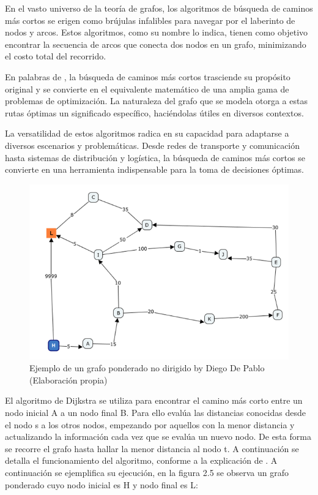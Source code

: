 En el vasto universo de la teoría de grafos, los algoritmos de búsqueda de caminos más cortos se erigen como brújulas infalibles para navegar por el laberinto de nodos y arcos. Estos algoritmos, como su nombre lo indica, tienen como objetivo encontrar la secuencia de arcos que conecta dos nodos en un grafo, minimizando el costo total del recorrido.

En palabras de \cite{deo}, la búsqueda de caminos más cortos trasciende su propósito original y se convierte en el equivalente matemático de una amplia gama de problemas de optimización. La naturaleza del grafo que se modela otorga a estas rutas óptimas un significado específico, haciéndolas útiles en diversos contextos.

La versatilidad de estos algoritmos radica en su capacidad para adaptarse a diversos escenarios y problemáticas. Desde redes de transporte y comunicación hasta sistemas de distribución y logística, la búsqueda de caminos más cortos se convierte en una herramienta indispensable para la toma de decisiones óptimas.

\begin{figure}[h]
	\centering \includegraphics[width=0.58\linewidth]{img/Grafo_ejemplo_5.png}
	\caption{Ejemplo de un grafo ponderado no dirigido by Diego De Pablo (Elaboración propia)}
	\label{fig:etiqueta1}
\end{figure}

El algoritmo de Dijkstra se utiliza para encontrar el camino más corto entre un nodo inicial A a un nodo final B. Para ello evalúa las distancias conocidas desde el nodo s a los otros nodos, empezando por aquellos con la menor distancia y actualizando la información cada vez que se evalúa un nuevo nodo. De esta forma se recorre el grafo hasta hallar la menor distancia al nodo t. A continuación se detalla el funcionamiento del algoritmo, conforme a la explicación de \cite{Minieka}. A continuación se ejemplifica su ejecución, en la figura 2.5 se observa un grafo ponderado cuyo nodo inicial es H y nodo final es L:

